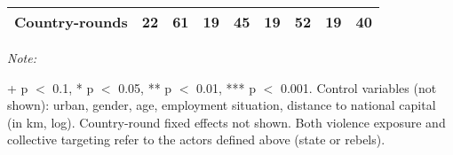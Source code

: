 \begin{table}[!h]
{\begin{threeparttable}
\begin{tabular}[t]{lcccccccc}
Country-rounds & 22 & 61 & 19 & 45 & 19 & 52 & 19 & 40\\
\bottomrule
\end{tabular}
\begin{tablenotes}[para]
\item \textit{Note: } 
\item + p $<$ 0.1, * p $<$ 0.05, ** p $<$ 0.01, *** p $<$ 0.001. Control variables (not shown): urban, gender, age, employment situation, distance to national capital (in km, log). Country-round fixed effects not shown. Both violence exposure and collective targeting refer to the actors defined above (state or rebels).
\end{tablenotes}
\end{threeparttable}}
\end{table}
